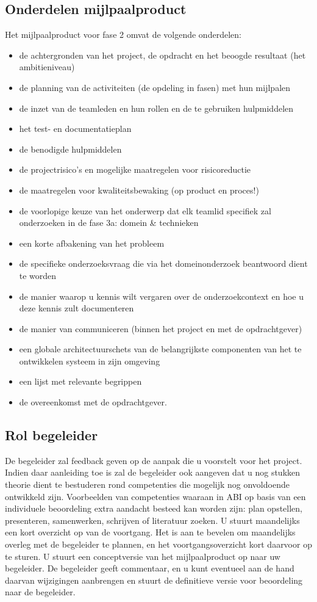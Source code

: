 \subsection{Onderdelen mijlpaalproduct}
    Het mijlpaalproduct voor fase 2 omvat de volgende onderdelen:
\begin{itemize}
    \item de achtergronden van het project, de opdracht en het beoogde resultaat
(het ambitieniveau)
    \item de planning van de activiteiten (de opdeling in fasen) met hun mijlpalen
    \item de inzet van de teamleden en hun rollen en de te gebruiken hulpmiddelen
    \item het test- en documentatieplan
    \item de benodigde hulpmiddelen
    \item de projectrisico’s en mogelijke maatregelen voor risicoreductie
    \item de maatregelen voor kwaliteitsbewaking (op product en proces!)
    \item de voorlopige keuze van het onderwerp dat elk teamlid specifiek zal
	    onderzoeken in de fase 3a: domein \& technieken
    \item een korte afbakening van het probleem
    \item de specifieke onderzoeksvraag die via het domeinonderzoek beantwoord
	    dient te worden
    \item de manier waarop u kennis wilt vergaren over de onderzoekcontext en hoe
	    u deze kennis zult documenteren
    \item de manier van communiceren (binnen het project en met de opdrachtgever)
    \item een globale architectuurschets van de belangrijkste componenten van het
	    te ontwikkelen systeem in zijn omgeving
    \item een lijst met relevante begrippen
    \item de overeenkomst met de opdrachtgever.
\end{itemize}

\subsection{Rol begeleider}
    De begeleider zal feedback geven op de aanpak die u voorstelt voor het
project.
    Indien daar aanleiding toe is zal de begeleider ook aangeven dat u nog
stukken theorie dient te bestuderen rond competenties die mogelijk nog
onvoldoende ontwikkeld zijn. Voorbeelden van competenties waaraan in ABI op
basis van een individuele beoordeling extra aandacht besteed kan worden zijn:
plan opstellen, presenteren, samenwerken, schrijven of literatuur zoeken.
    U stuurt maandelijks een kort overzicht op van de voortgang. Het is aan te
bevelen om maandelijks overleg met de begeleider te plannen, en het
voortgangsoverzicht kort daarvoor op te sturen.
    U stuurt een conceptversie van het mijlpaalproduct op naar uw begeleider. De
begeleider geeft commentaar, en u kunt eventueel aan de hand daarvan wijzigingen
aanbrengen en stuurt de definitieve versie voor beoordeling naar de begeleider.

